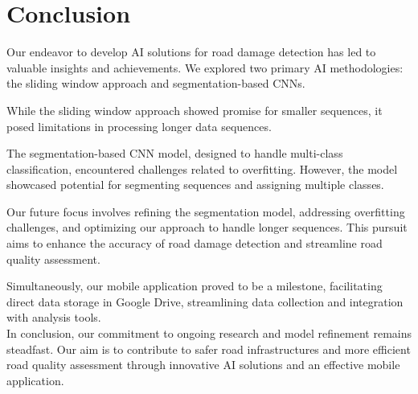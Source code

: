 \section{Conclusion}

Our endeavor to develop AI solutions for road damage detection has led to valuable insights and achievements. We explored two primary AI methodologies: the sliding window approach and segmentation-based CNNs.

While the sliding window approach showed promise for smaller sequences, it posed limitations in processing longer data sequences.

The segmentation-based CNN model, designed to handle multi-class classification, encountered challenges related to overfitting. However, the model showcased potential for segmenting sequences and assigning multiple classes.

Our future focus involves refining the segmentation model, addressing overfitting challenges, and optimizing our approach to handle longer sequences. This pursuit aims to enhance the accuracy of road damage detection and streamline road quality assessment.

Simultaneously, our mobile application proved to be a milestone, facilitating direct data storage in Google Drive, streamlining data collection and integration with analysis tools.\\

In conclusion, our commitment to ongoing research and model refinement remains steadfast. Our aim is to contribute to safer road infrastructures and more efficient road quality assessment through innovative AI solutions and an effective mobile application.
